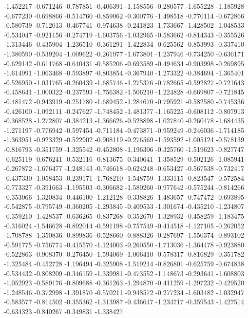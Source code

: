 -1.452217
-0.671246
-0.787851
-0.406391
-1.158556
-0.280577
-1.655228
-1.185928
-0.677230
-0.698866
-0.514760
-0.859062
-0.300776
-1.498518
-0.770114
-0.672866
-0.580739
-0.712013
-0.467741
-0.974638
-0.241823
-1.733667
-1.428502
-1.048533
-0.534047
-0.921156
-0.274719
-1.603756
-1.032965
-0.583662
-0.814343
-0.355526
-1.313446
-0.435904
-1.236510
-0.361291
-1.422834
-0.625562
-0.853993
-0.337410
-1.380590
-0.539204
-1.009622
-0.261977
-1.673801
-1.237946
-0.734250
-0.636171
-0.629142
-0.611768
-0.640431
-0.585206
-0.693589
-0.494634
-0.903998
-0.269895
-1.614991
-1.063468
-0.593897
-0.803854
-0.367940
-1.273322
-0.384694
-1.365401
-0.526950
-1.031765
-0.260439
-1.685746
-1.275376
-0.782665
-0.592827
-0.721643
-0.458641
-1.000322
-0.237593
-1.756382
-1.506210
-1.224828
-0.669807
-0.721845
-0.481472
-0.943919
-0.251780
-1.689452
-1.284670
-0.795921
-0.582580
-0.745336
-0.426100
-1.092111
-0.247627
-1.748452
-1.481377
-1.165225
-0.608112
-0.807913
-0.368528
-1.272807
-0.384213
-1.366626
-0.528898
-1.027840
-0.260478
-1.684435
-1.271197
-0.776942
-0.597454
-0.711184
-0.473871
-0.959249
-0.246036
-1.714185
-1.363951
-0.923329
-0.522902
-0.908119
-0.276569
-1.593592
-1.005124
-0.578139
-0.816793
-0.351759
-1.325542
-0.452808
-1.196306
-0.325760
-1.519623
-0.827747
-0.625119
-0.676241
-0.532116
-0.813675
-0.340641
-1.358529
-0.502126
-1.085941
-0.267872
-1.676477
-1.248143
-0.746618
-0.624248
-0.653427
-0.567538
-0.732417
-0.437330
-1.058453
-0.239171
-1.768210
-1.548759
-1.333115
-0.823547
-0.572584
-0.773327
-0.391663
-1.195503
-0.306682
-1.580260
-0.977642
-0.575244
-0.814266
-0.353066
-1.320834
-0.446100
-1.212128
-0.338826
-1.483657
-0.747472
-0.693895
-0.542875
-0.795749
-0.360205
-1.293845
-0.409533
-1.301674
-0.435210
-1.234807
-0.359210
-1.428537
-0.636265
-0.837268
-0.352670
-1.328932
-0.458259
-1.183475
-0.316024
-1.546628
-0.892014
-0.591198
-0.757549
-0.414518
-1.127105
-0.262052
-1.708788
-1.350836
-0.899836
-0.528660
-0.888326
-0.287697
-1.550374
-0.893102
-0.591775
-0.756774
-0.415570
-1.124003
-0.260550
-1.713036
-1.364478
-0.923880
-0.522863
-0.908370
-0.276450
-1.594069
-1.006410
-0.578317
-0.816829
-0.351782
-1.325484
-0.452728
-1.196494
-0.325908
-1.519214
-0.826801
-0.625759
-0.674838
-0.534432
-0.808209
-0.346159
-1.339981
-0.473552
-1.148673
-0.293641
-1.608803
-1.052923
-0.589176
-0.809688
-0.361263
-1.294870
-0.411259
-1.297232
-0.429520
-1.248546
-0.372998
-1.391870
-0.570211
-0.948572
-0.277234
-1.603482
-1.032947
-0.583577
-0.814502
-0.355362
-1.313987
-0.436647
-1.234717
-0.359543
-1.427514
-0.634323
-0.840267
-0.349831
-1.338427
